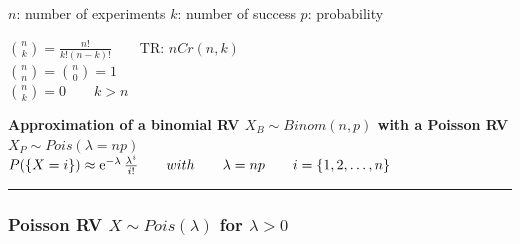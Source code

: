 $n$: number of experiments \hspace{10mm}
$k$: number of success \hspace{10mm}
$p$: probability\\

\begin{minipage}{8cm}
\end{minipage}
\begin{minipage}{6cm}	
	$\binom n k =\frac{n!}{k!(n-k)!}\qquad\text{TR: }nCr(n,k)$\\[0.5cm]
	$\binom n n = \binom n 0=1$\\[0.5cm]
	$\binom n k =0 \qquad k>n$\\[0.5cm]
\end{minipage}
\hfill

\textbf{Approximation of a binomial RV $X_B\sim Binom(n,p)$ with a Poisson RV  $X_P\sim Pois(\lambda=np)$}\\

$P(\{X=i\})\approx\operatorname{\mathrm e}^{-\lambda}\frac{\lambda^i}{i!}\qquad with\qquad \lambda=np \qquad i=\{1,2,\ldots,n\}$

\vspace{2mm}
\hrule
\vspace{3mm}

\subsubsection{Poisson RV $X\sim Pois(\lambda)$ for $\lambda>0$ }

